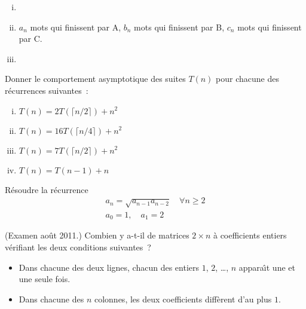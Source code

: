 \begin{enumerate}[(i)]
\item

\item $a_n$ mots qui finissent par A, $b_n$ mots qui finissent par B, $c_n$ mots qui finissent par C.

\item 
\end{enumerate}


\begin{exo}
Donner le comportement asymptotique des suites $T(n)$ pour chacune des r\'ecurrences suivantes~:
%
\begin{enumerate}[(i)]
\item $T(n) = 2T(\lceil n/2 \rceil) + n^2$
\item $T(n) = 16T(\lceil n/4 \rceil) + n^2$
\item $T(n) = 7 T(\lceil n/2 \rceil) + n^2$
\item $T(n) = T(n-1) + n$
\end{enumerate}
\end{exo}


\begin{exo}
R\'esoudre la r\'ecurrence
\[
\begin{array}{l}
a_n = \sqrt{a_{n-1} a_{n-2}} \quad \forall n \geqslant 2\\
a_0 = 1, \quad a_1 = 2
\end{array}
\]
\end{exo}


\begin{exo} (Examen ao\^ut 2011.)
Combien y a-t-il de matrices $2 \times n$ \`a coefficients entiers v\'erifiant les deux conditions suivantes~?
%
\begin{itemize}
\item Dans chacune des deux lignes, chacun des entiers $1$, $2$, \ldots, $n$ appara\^\i{}t une et une seule fois.
\item Dans chacune des $n$ colonnes, les deux coefficients diff\`erent d'au plus $1$.
\end{itemize}
\end{exo}
